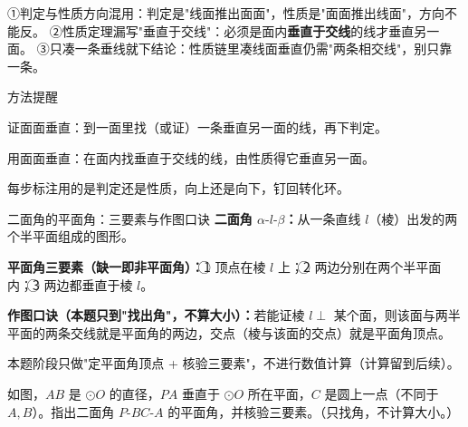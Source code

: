 \documentclass{exam-zh}
\begin{document}
\begin{eduMistakeBox}
①判定与性质方向混用：判定是"线面推出面面"，性质是"面面推出线面"，方向不能反。
②性质定理漏写"垂直于交线"：必须是面内\textbf{垂直于交线}的线才垂直另一面。
③只凑一条垂线就下结论：性质链里凑线面垂直仍需"两条相交线"，别只靠一条。
\end{eduMistakeBox}




\begin{eduSummaryBlock}{\eduIconPin}{方法提醒}
\begin{eduBulletList}
  \item 证面面垂直：到一面里找（或证）一条垂直另一面的线，再下判定。  \item 用面面垂直：在面内找垂直于交线的线，由性质得它垂直另一面。  \item 每步标注用的是判定还是性质，向上还是向下，钉回转化环。\end{eduBulletList}
\end{eduSummaryBlock}



\clearpage
{}


\begin{eduSolutionBox}{二面角的平面角：三要素与作图口诀}
  \begingroup
  \setlength{\parskip}{2.5mm}
\textbf{二面角 $\alpha\text{-}l\text{-}\beta$：}从一条直线 $l$（棱）出发的两个半平面组成的图形。\par
\textbf{平面角三要素（缺一即非平面角）：}\textcircled{1} 顶点在棱 $l$ 上；\textcircled{2} 两边分别在两个半平面内；\textcircled{3} 两边都垂直于棱 $l$。\par
\textbf{作图口诀（本题只到"找出角"，不算大小）：}若能证棱 $l\perp$ 某个面，则该面与两半平面的两条交线就是平面角的两边，交点（棱与该面的交点）就是平面角顶点。\par
本题阶段只做"定平面角顶点 + 核验三要素"，不进行数值计算（计算留到后续）。\par
  \endgroup
\end{eduSolutionBox}




\begin{eduProblemBlock}[例题 4]
\noindent
\begin{minipage}[t]{\dimexpr\linewidth-70mm-6mm\relax}
\vspace{0pt}
如图，$AB$ 是 $\odot O$ 的直径，$PA$ 垂直于 $\odot O$ 所在平面，$C$ 是圆上一点（不同于 $A,B$）。指出二面角 $P\text{-}BC\text{-}A$ 的平面角，并核验三要素。（只找角，不计算大小。）

\end{minipage}\hfill
\begin{diagramcoltikz}{70mm}{PA⊥圆面，AB 为直径，C 在圆上，找二面角 P-BC-A 的平面角顶点。}
}
\end{diagramcoltikz}
\end{eduProblemBlock}
\end{document}
